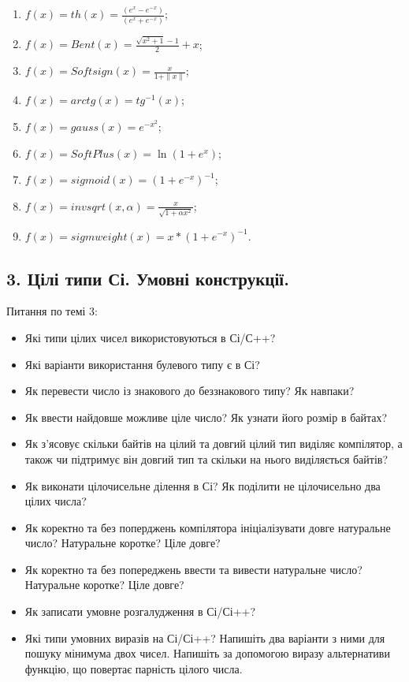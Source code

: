 \documentclass[]{article}
\makeatletter
\newcommand{\xslalph}[1]{\expandafter\@xslalph\csname c@#1\endcsname}
\newcommand{\@xslalph}[1]{%
    \ifcase#1\or а\or б\or в\or г\or д\or e\or є\or ж\or з\or i%
    \or й\or к\or л\or м\or н\or о\or п\or р\or с\or т%
    \or у\or ф\or х\or ц\or ч\or ш\or ю\or я\or аа\or бб\or вв%
    \else\@ctrerr\fi%
}
\makeatother
\begin{document}
\begin{enumerate}
  \begin{enumerate}[label=\xslalph*)]
  \item   \(f(x) = th(x) = \frac{(e^{x} - e^{-x})}{(e^{x} + e^{-x})}\);
\item \(f(x) = Bent(x) = \frac{\sqrt{x^{2} + 1} - 1}{2} + x\);
\item \(f(x) = Softsign(x) = \frac{x}{1 + \|x\|}\);
\item \(f(x) = arctg(x) = tg^{-1}(x)\);
\item\(f(x) = gauss(x) = e^{-x^{2}}\);
\item \(f(x) = SoftPlus(x) = \ln(1 + e^{x})\);
\item \(f(x) = sigmoid(x) = {(1 + e^{-x})}^{-1}\);
\item \(f(x) = invsqrt(x,\alpha) = \frac{x}{\sqrt{1 + \alpha x^{2}}}\);
\item\(f(x) = sigmweight(x) = x*{(1 + e^{-x})}^{-1}\).

 \end{enumerate}
\end{enumerate}


\newpage
\subsection{ 3. Цілі типи Сі. Умовні конструкції.}
\setcounter{subsection}{1}

Питання по темі 3:

\begin{itemize}
\item Які типи цілих чисел використовуються в Сі/С++?
\item Які варіанти використання булевого типу є в Сі?
\item Як перевести число із знакового до беззнакового типу? Як навпаки?
\item Як ввести найдовше можливе ціле число? Як узнати його розмір в
байтах?
\item Як з'ясовує скільки байтів на цілий та довгий
цілий тип виділяє компілятор, а також чи підтримує він довгий тип та
скільки на нього виділяється байтів?
\item Як виконати цілочисельне ділення в Сі? Як поділити не цілочисельно
два цілих числа?
\item Як коректно та без поперджень компілятора ініціалізувати довге
натуральне число? Натуральне коротке? Ціле довге?
\item Як коректно та без попереджень ввести та вивести натуральне число?
Натуральне коротке? Ціле довге?
\item Як записати умовне розгалудження в Сі/Сі++?
\item Які типи умовних виразів на Сі/Сі++? Напишіть два варіанти з ними для
пошуку мінимума двох чисел. Напишіть за допомогою виразу альтернативи
функцію, що повертає парність цілого числа.
\end{itemize}
\end{document}
